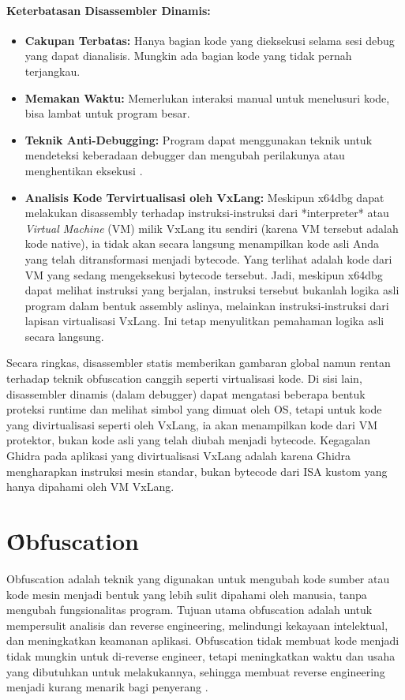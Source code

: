 \paragraph{Keterbatasan Disassembler Dinamis:}
\begin{itemize}
\item \textbf{Cakupan Terbatas:} Hanya bagian kode yang dieksekusi selama sesi debug yang dapat dianalisis. Mungkin ada bagian kode yang tidak pernah terjangkau.
\item \textbf{Memakan Waktu:} Memerlukan interaksi manual untuk menelusuri kode, bisa lambat untuk program besar.
\item \textbf{Teknik Anti-Debugging:} Program dapat menggunakan teknik untuk mendeteksi keberadaan debugger dan mengubah perilakunya atau menghentikan eksekusi \cite{Sikorski2012}.
\item \textbf{Analisis Kode Tervirtualisasi oleh VxLang:} Meskipun x64dbg dapat melakukan disassembly terhadap instruksi-instruksi dari *interpreter* atau \textit{Virtual Machine} (VM) milik VxLang itu sendiri (karena VM tersebut adalah kode native), ia tidak akan secara langsung menampilkan kode asli Anda yang telah ditransformasi menjadi bytecode. Yang terlihat adalah kode dari VM yang sedang mengeksekusi bytecode tersebut. Jadi, meskipun x64dbg dapat melihat instruksi yang berjalan, instruksi tersebut bukanlah logika asli program dalam bentuk assembly aslinya, melainkan instruksi-instruksi dari lapisan virtualisasi VxLang. Ini tetap menyulitkan pemahaman logika asli secara langsung.
\end{itemize}

Secara ringkas, disassembler statis memberikan gambaran global namun rentan terhadap teknik obfuscation canggih seperti virtualisasi kode. Di sisi lain, disassembler dinamis (dalam debugger) dapat mengatasi beberapa bentuk proteksi runtime dan melihat simbol yang dimuat oleh OS, tetapi untuk kode yang divirtualisasi seperti oleh VxLang, ia akan menampilkan kode dari VM protektor, bukan kode asli yang telah diubah menjadi bytecode. Kegagalan Ghidra pada aplikasi yang divirtualisasi VxLang adalah karena Ghidra mengharapkan instruksi mesin standar, bukan bytecode dari ISA kustom yang hanya dipahami oleh VM VxLang.

\section{\f{Obfuscation}}
Obfuscation adalah teknik yang digunakan untuk mengubah kode sumber atau kode mesin menjadi bentuk yang lebih sulit dipahami oleh manusia, tanpa mengubah fungsionalitas program. Tujuan utama obfuscation adalah untuk mempersulit analisis dan reverse engineering, melindungi kekayaan intelektual, dan meningkatkan keamanan aplikasi. Obfuscation tidak membuat kode menjadi tidak mungkin untuk di-reverse engineer, tetapi meningkatkan waktu dan usaha yang dibutuhkan untuk melakukannya, sehingga membuat reverse engineering menjadi kurang menarik bagi penyerang \cite{Jin24}.

